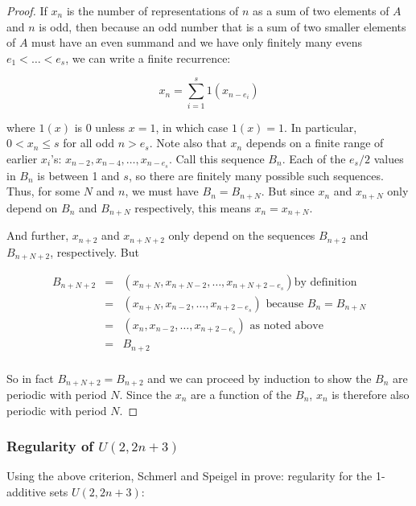 \documentclass{article}
\theoremstyle{definition}
\theoremstyle{remark}
\numberwithin{equation}{section}
\begin{document}
\begin{proof}

  If $x_n$ is the number of representations of $n$ as a sum of two
  elements of $A$ and $n$ is odd, then because an odd number that is a
  sum of two smaller elements of $A$ must have an even summand and we
  have only finitely many evens $e_1 < \ldots < e_s$, we can write a
  finite recurrence:

  \[x_n = \sum_{i=1}^s 1(x_{n-e_i})\]
  
  where $1(x)$ is 0 unless $x = 1$, in which case $1(x) = 1$.  In
  particular, $0 < x_n \leq s$ for all odd $n > e_s$.  Note also that
  $x_n$ depends on a finite range of earlier $x_i$'s:
  $x_{n-2}, x_{n-4}, \ldots, x_{n-e_s}$.  Call this sequence $B_n$.
  Each of the $e_s/2$ values in $B_n$ is between 1 and $s$, so there
  are finitely many possible such sequences.  Thus, for some $N$ and
  $n$, we must have $B_n = B_{n+N}$.  But since $x_n$ and $x_{n+N}$
  only depend on $B_n$ and $B_{n+N}$ respectively, this means
  $x_n = x_{n+N}$.

  And further, $x_{n+2}$ and $x_{n+N+2}$ only depend on the sequences
  $B_{n+2}$ and $B_{n+N+2}$, respectively.  But 

  \begin{eqnarray*}
    B_{n+N+2} &=& (x_{n+N}, x_{n+N-2}, \ldots, x_{n+N+2-e_s}) \text{
    by definition}\\
    &=& (x_{n+N}, x_{n-2}, \ldots, x_{n+2-e_s}) \text{ because $B_n
                                                  = B_{n+N}$}\\
    &=& (x_{n}, x_{n-2}, \ldots, x_{n+2-e_s}) \text{ as noted
                                                above}\\
              &=& B_{n+2}\\
  \end{eqnarray*}

  So in fact $B_{n+N+2} = B_{n+2}$ and we can proceed by induction to
  show the $B_n$ are periodic with period $N$.  Since the $x_n$ are a
  function of the $B_n$, $x_n$ is therefore also periodic with period
  $N$.
\end{proof}

\subsubsection{Regularity of $U(2,2n+3)$}

Using the above criterion, Schmerl and Speigel in
\cite{regularity_schmerl} prove: regularity for the 1-additive sets
$U(2, 2n+3)$:
\end{document}
